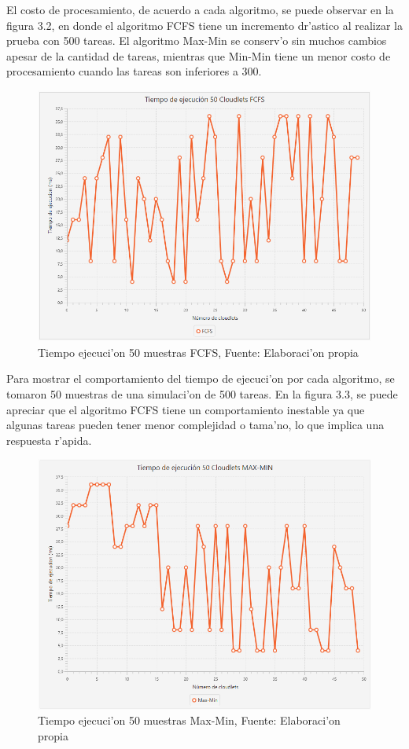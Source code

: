 El costo de procesamiento, de acuerdo a cada algoritmo, se puede observar en la figura 3.2, en donde el algoritmo FCFS tiene un incremento dr'astico al realizar la prueba con 500 tareas. El algoritmo Max-Min se conserv'o sin muchos cambios apesar de la cantidad de tareas, mientras que Min-Min tiene un menor costo de procesamiento cuando las tareas son inferiores a 300.


\begin{figure}[h] 
	\caption{Tiempo ejecuci'on 50 muestras FCFS, Fuente: Elaboraci'on propia}
	\centering
	\includegraphics[scale=0.5]{media/fcfs}
\end{figure}


Para mostrar el comportamiento del tiempo de ejecuci'on por cada algoritmo, se tomaron 50 muestras de una simulaci'on de 500 tareas. En la figura 3.3, se puede apreciar que el algoritmo FCFS tiene un comportamiento inestable ya que algunas tareas pueden tener menor complejidad o tama'no, lo que implica una respuesta r'apida.

\begin{figure}[H] 
	\caption{Tiempo ejecuci'on 50 muestras Max-Min, Fuente: Elaboraci'on propia}
	\centering
	\includegraphics[scale=0.5]{media/max-min}
\end{figure}


